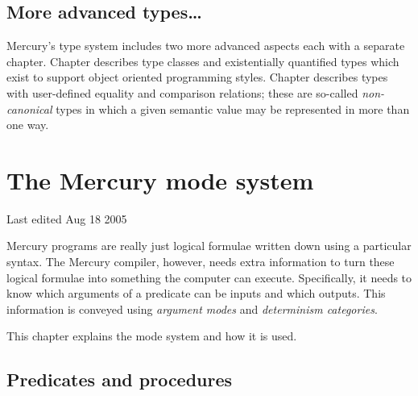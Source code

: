 \documentclass[a4paper,11pt,notitlepage,onecolumn]{book}
\begin{document}
\section{More advanced types\ldots}

Mercury's type system includes two more advanced aspects each with a
separate chapter.  Chapter \XXX{} describes type classes and existentially
quantified types which exist to support object oriented programming styles.
Chapter \XXX{} describes types with user-defined equality and comparison
relations; these are so-called \emph{non-canonical} types in which a given
semantic value may be represented in more than one way.



\setcounter{chapter}{2}



\chapter{The Mercury mode system}

Last edited Aug 18 2005

Mercury programs are really just logical formulae written down using a
particular syntax.  The Mercury compiler, however, needs extra information
to turn these logical formulae into something the computer can execute.
Specifically, it needs to know which arguments of a predicate 
can be inputs and which outputs.  This information is conveyed using
\emph{argument modes} and \emph{determinism categories}.

This chapter explains the mode system and how it is used.

\section{Predicates and procedures}
\end{document}
